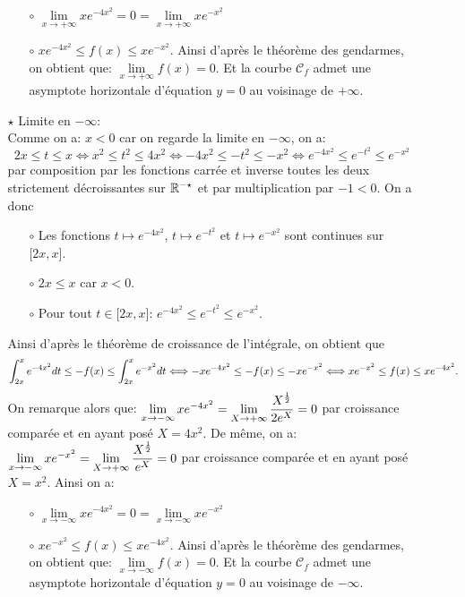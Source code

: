 \documentclass[a4paper, 11pt,reqno]{article}
\begin{document}
\begin{correction}
\begin{itemize}
\begin{itemize}
			            \begin{itemize}
				            \item[$\circ$] $\lim\limits_{x\to +\infty} xe^{-4x^2}=0=\lim\limits_{x\to +\infty} xe^{-x^2}$
				            \item[$\circ$] $xe^{-4x^2} \leq f(x)\leq xe^{-x^2}$.
				                  Ainsi d'apr\`{e}s le th\'eor\`{e}me des gendarmes, on obtient que: $\lim\limits_{x\to +\infty} f(x)=0$. Et la courbe $\mathcal{C}_f$ admet une asymptote horizontale d'\'equation $y=0$ au voisinage de $+\infty$.
			            \end{itemize}
			      \item[$\star$] Limite en $-\infty$:\\
			            \noindent Comme on a: $x<0$ car on regarde la limite en $-\infty$, on a:
			            $$2x\leq t\leq x\Leftrightarrow x^2\leq t^2\leq 4x^2\Leftrightarrow -4x^2\leq -t^2\leq -x^2\Leftrightarrow e^{-4x^2}\leq e^{-t^2}\leq e^{-x^2}$$
			            par composition par les fonctions carr\'ee et inverse toutes les deux strictement d\'ecroissantes sur $\mathbb{R}^{-\star}$ et par multiplication par $-1<0$. On a donc
			            \begin{itemize}
				            \item[$\circ$] Les fonctions $t\mapsto e^{-4x^2}$, $t\mapsto e^{-t^2}$ et $t\mapsto e^{-x^2}$ sont continues sur $\lbrack 2x,x\rbrack$.
				            \item[$\circ$] $2x\leq x$ car $x<0$.
				            \item[$\circ$] Pour tout $t\in\lbrack 2x,x\rbrack$: $e^{-4x^2}\leq e^{-t^2}\leq e^{-x^2}$.
			            \end{itemize}
			            Ainsi d'apr\`{e}s le th\'eor\`{e}me de croissance de l'int\'egrale, on obtient que
			            $$\displaystyle\int_{2x}^{x} e^{-4x^2}dt \leq -f(x)\leq \displaystyle\int_{2x}^{x} e^{-x^2}dt
				            \Longleftrightarrow -xe^{-4x^2} \leq -f(x)\leq -xe^{-x^2}\Longleftrightarrow xe^{-x^2} \leq f(x)\leq xe^{-4x^2}.$$
			            On remarque alors que: $\lim\limits_{x\to -\infty} xe^{-4x^2}=\lim\limits_{X\to +\infty} \displaystyle\frac{X^{\frac{1}{2}}}{2e^X}=0$ par croissance compar\'ee et en ayant pos\'e $X=4x^2$. De m\^{e}me, on a: $\lim\limits_{x\to -\infty} xe^{-x^2}=\lim\limits_{X\to +\infty} \displaystyle\frac{X^{\frac{1}{2}}}{e^X}=0$ par croissance compar\'ee et en ayant pos\'e $X=x^2$. Ainsi on a:
			            \begin{itemize}
				            \item[$\circ$] $\lim\limits_{x\to -\infty} xe^{-4x^2}=0=\lim\limits_{x\to -\infty} xe^{-x^2}$
				            \item[$\circ$] $xe^{-x^2} \leq f(x)\leq xe^{-4x^2}$.
				                  Ainsi d'apr\`{e}s le th\'eor\`{e}me des gendarmes, on obtient que: $\lim\limits_{x\to -\infty} f(x)=0$. Et la courbe $\mathcal{C}_f$ admet une asymptote horizontale d'\'equation $y=0$ au voisinage de $-\infty$.
			            \end{itemize}
		      \end{itemize}
	\end{itemize}
\end{correction}
\end{document}
